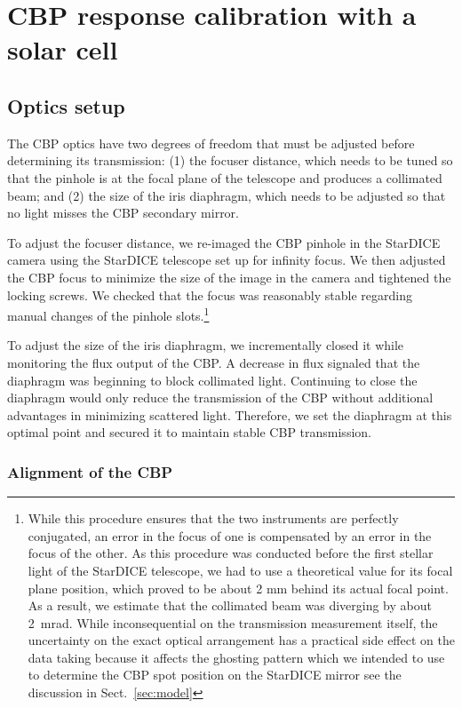 \section{CBP response calibration with a solar cell}
\label{sec:rcbp}

\subsection{Optics setup}

The CBP optics have two degrees of freedom that must be adjusted
before determining its transmission: (1) the focuser distance, which
needs to be tuned so that the pinhole is at the focal plane of the
telescope and produces a collimated beam; and (2) the size of the iris
diaphragm, which needs to be adjusted so that no light misses the CBP
secondary mirror.

To adjust the focuser distance, we re-imaged the CBP pinhole in the
StarDICE camera using the StarDICE telescope set up for infinity
focus. We then adjusted the CBP focus to minimize the size of the
image in the camera and tightened the locking screws. We checked
that the focus was reasonably stable regarding manual changes of the pinhole
slots.\footnote{While this procedure ensures that the two instruments
  are perfectly conjugated, an error in the focus of one is
  compensated by an error in the focus of the other. As this procedure
  was conducted before the first stellar light of the StarDICE
  telescope, we had to use a theoretical value for its focal plane
  position, which proved to be about 2 mm behind its actual focal
  point. As a result, we estimate that the collimated beam was
  diverging by about 2~mrad. While inconsequential on the transmission
  measurement itself, the uncertainty on the exact optical arrangement
  has a practical side effect on the data taking because it affects the
  ghosting pattern which we intended to use to determine the CBP spot
  position on the StarDICE mirror see the discussion in Sect.~\ref{sec:model}}

To adjust the size of the iris diaphragm, we incrementally closed it
while monitoring the flux output of the CBP. A decrease in flux
signaled that the diaphragm was beginning to block collimated
light. Continuing to close the diaphragm would only reduce the
transmission of the CBP without additional advantages in minimizing
scattered light. Therefore, we set the diaphragm at this optimal point
and secured it to maintain stable CBP transmission.

\subsubsection{Alignment of the CBP}

